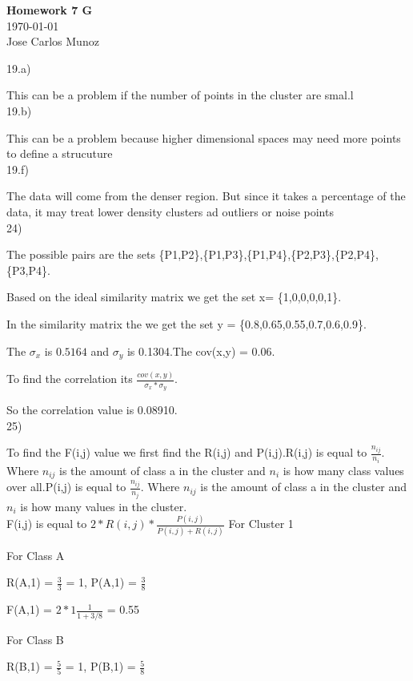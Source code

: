 \documentclass[12pt,english]{article}
\begin{document}
\begin{center}
    \Large
    \textbf{Homework 7 G}\\
    \small
    \today\\
    \large
    Jose Carlos Munoz
\end{center}%
19.a)\par
This can be a problem if the number of points in the cluster are smal.l\\
19.b)\par
This can be a problem because higher dimensional spaces may need more points to define a strucuture\\
19.f)\par
The data will come from the denser region. But since it takes a percentage of the data, it may treat lower density clusters ad outliers or noise points\\
24)\par
The possible pairs are the sets \{P1,P2\},\{P1,P3\},\{P1,P4\},\{P2,P3\},\{P2,P4\},\{P3,P4\}.\par
Based on the ideal similarity matrix we get the set x= \{1,0,0,0,0,1\}.\par
In the  similarity matrix the we get the set y = \{0.8,0.65,0.55,0.7,0.6,0.9\}.\par
The $\sigma_x$ is $0.5164$ and $\sigma_y$ is 0.1304.The cov(x,y) = 0.06. \par
To find the correlation its $\frac{cov(x,y)}{\sigma_x * \sigma_y}$.\par
So the correlation value is 0.08910.\\
25)\par
To find the F(i,j) value we first find the R(i,j) and P(i,j).R(i,j) is equal to $\frac{n_{ij}}{n_i}$. Where $n_{ij}$ is the amount of class a in the cluster and $n_i$ is how many class values over all.P(i,j) is equal to $\frac{n_{ij}}{n_j}$. Where $n_{ij}$ is the amount of class a in the cluster and $n_i$ is how many values in the cluster.\\
F(i,j) is equal to $2 * R(i,j) * \frac{P(i,j)}{P(i,j) + R(i,j)}$
For Cluster 1\par
For Class A\par
R(A,1) = $\frac{3}{3}$ = 1, P(A,1) = $\frac{3}{8}$\par
F(A,1) = $2 * 1 \frac{1}{1 + 3/8}$ = 0.55\par
For Class B\par
R(B,1) = $\frac{5}{5}$ = 1, P(B,1) = $\frac{5}{8}$\par
\end{document}
